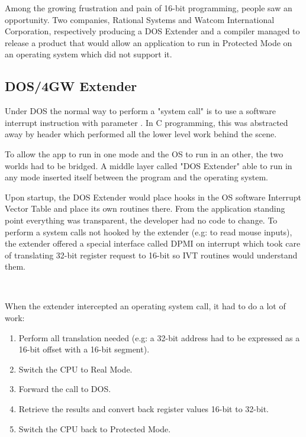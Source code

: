 \par
Among the growing frustration and pain of 16-bit programming, people saw an opportunity. Two companies, Rational Systems and Watcom International Corporation, respectively producing a DOS Extender and a compiler managed to release a product that would allow an application to run in Protected Mode on an operating system which did not support it.\\
\par


\subsection{DOS/4GW Extender}
Under DOS the normal way to perform a "system call" is to use a software interrupt instruction with parameter . In C programming, this was abstracted away by header  which performed all the lower level work behind the scene.\\
\par
{}
To allow the app to run in one mode and the OS to run in an other, the two worlds had to be bridged. A middle layer called "DOS Extender" able to run in any mode inserted itself between the program and the operating system.\\

\par
{}
Upon startup, the DOS Extender would place hooks in the OS software Interrupt Vector Table and place its own routines there. From the application standing point everything was transparent, the developer had no code to change. To perform a system calls not hooked by the extender (e.g:  to read mouse inputs), the extender offered a special interface called DPMI on interrupt  which took care of translating 32-bit register request to 16-bit so IVT routines would understand them.\\
\par
{}\\
\par
When the extender intercepted an operating system call, it had to do a lot of work:
\begin{enumerate}
\item Perform all translation needed (e.g: a 32-bit address had to be expressed as a 16-bit offset with a 16-bit segment).
\item Switch the CPU to Real Mode.
\item Forward the call to DOS.
\item Retrieve the results and convert back register values 16-bit to 32-bit.
\item Switch the CPU back to Protected Mode.
\end{enumerate} 

